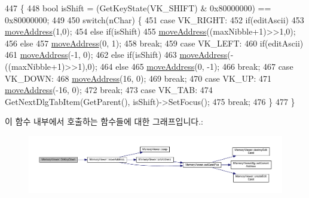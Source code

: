 \begin{DoxyCode}
447 \{
448   \textcolor{keywordtype}{bool} isShift = (GetKeyState(VK\_SHIFT) & 0x80000000) == 0x80000000;
449 
450   \textcolor{keywordflow}{switch}(nChar) \{
451   \textcolor{keywordflow}{case} VK\_RIGHT:
452     \textcolor{keywordflow}{if}(editAscii)
453       \mbox{\hyperlink{class_memory_viewer_a0a371c925fc00dd78fedd8d21ebc8cdc}{moveAddress}}(1,0);
454     \textcolor{keywordflow}{else} \textcolor{keywordflow}{if}(isShift)
455       \mbox{\hyperlink{class_memory_viewer_a0a371c925fc00dd78fedd8d21ebc8cdc}{moveAddress}}((maxNibble+1)>>1,0);
456     \textcolor{keywordflow}{else}
457       \mbox{\hyperlink{class_memory_viewer_a0a371c925fc00dd78fedd8d21ebc8cdc}{moveAddress}}(0, 1);
458     \textcolor{keywordflow}{break};
459   \textcolor{keywordflow}{case} VK\_LEFT:
460     \textcolor{keywordflow}{if}(editAscii)
461       \mbox{\hyperlink{class_memory_viewer_a0a371c925fc00dd78fedd8d21ebc8cdc}{moveAddress}}(-1, 0);
462     \textcolor{keywordflow}{else} \textcolor{keywordflow}{if}(isShift)
463       \mbox{\hyperlink{class_memory_viewer_a0a371c925fc00dd78fedd8d21ebc8cdc}{moveAddress}}(-((maxNibble+1)>>1),0);
464     \textcolor{keywordflow}{else}
465       \mbox{\hyperlink{class_memory_viewer_a0a371c925fc00dd78fedd8d21ebc8cdc}{moveAddress}}(0, -1);
466     \textcolor{keywordflow}{break};  
467   \textcolor{keywordflow}{case} VK\_DOWN:
468     \mbox{\hyperlink{class_memory_viewer_a0a371c925fc00dd78fedd8d21ebc8cdc}{moveAddress}}(16, 0);
469     \textcolor{keywordflow}{break};
470   \textcolor{keywordflow}{case} VK\_UP:
471     \mbox{\hyperlink{class_memory_viewer_a0a371c925fc00dd78fedd8d21ebc8cdc}{moveAddress}}(-16, 0);
472     \textcolor{keywordflow}{break};
473   \textcolor{keywordflow}{case} VK\_TAB:
474     GetNextDlgTabItem(GetParent(), isShift)->SetFocus();
475     \textcolor{keywordflow}{break};
476   \}
477 \}
\end{DoxyCode}
이 함수 내부에서 호출하는 함수들에 대한 그래프입니다.\+:
\nopagebreak
\begin{figure}[H]
\begin{center}
\leavevmode
\includegraphics[width=350pt]{class_memory_viewer_afc4781b16d21212f67e5dd299c537718_cgraph}
\end{center}
\end{figure}
\mbox{\label{class_memory_viewer_af513c221df2a84b02c4172213cdbeec1}} 
